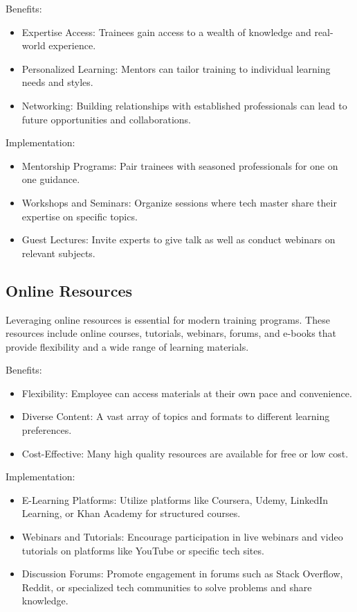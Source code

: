 Benefits:
\begin{itemize}
    

  \item  Expertise Access: Trainees gain access to a wealth of knowledge and real-world experience.
  \item Personalized Learning: Mentors can tailor training to individual learning needs and styles.
  \item Networking: Building relationships with established professionals can lead to future opportunities and collaborations.
\end{itemize}
Implementation:
\begin{itemize}
  \item   Mentorship Programs: Pair trainees with seasoned professionals for one on one guidance.
    \item Workshops and Seminars: Organize sessions where tech master share their expertise on specific topics.
    \item Guest Lectures: Invite experts to give talk as well as conduct webinars on relevant subjects.
\end{itemize}
\subsection{Online Resources}


Leveraging online resources is essential for modern training programs. These resources include online courses, tutorials, webinars, forums, and e-books that provide flexibility and a wide range of learning materials.

Benefits:
\begin{itemize}
   \item Flexibility: Employee can access materials at their own pace and convenience.
    \item Diverse Content: A vast array of topics and formats to different learning preferences.
    \item Cost-Effective: Many high quality resources are available for free or low cost.
\end{itemize}
Implementation:
\begin{itemize}
    \item E-Learning Platforms: Utilize platforms like Coursera, Udemy, LinkedIn Learning, or Khan Academy for structured courses.
    \item Webinars and Tutorials: Encourage participation in live webinars and video tutorials on platforms like YouTube or specific tech sites.
    \item Discussion Forums: Promote engagement in forums such as Stack Overflow, Reddit, or specialized tech communities to solve problems and share knowledge.
\end{itemize}
